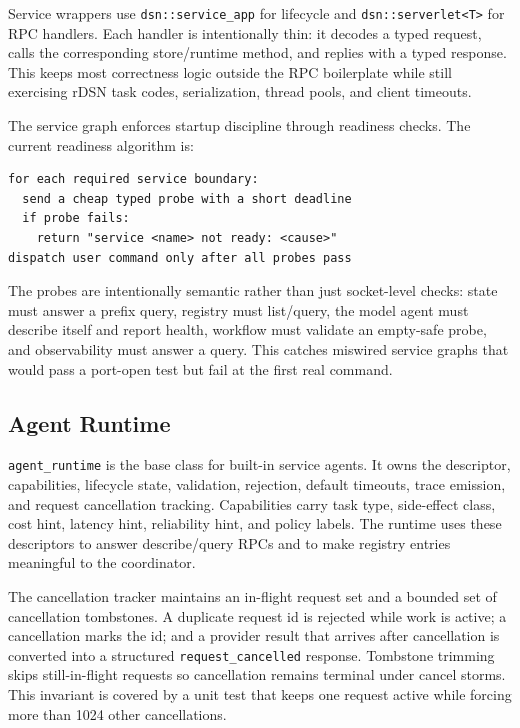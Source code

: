 \documentclass[manuscript,screen,review]{acmart}
\begin{document}
Service wrappers use \texttt{dsn::service\_app} for lifecycle and
\texttt{dsn::serverlet<T>} for RPC handlers. Each handler is intentionally thin:
it decodes a typed request, calls the corresponding store/runtime method, and
replies with a typed response. This keeps most correctness logic outside the RPC
boilerplate while still exercising rDSN task codes, serialization, thread pools,
and client timeouts.

The service graph enforces startup discipline through readiness checks. The
current readiness algorithm is:

\begin{lstlisting}
for each required service boundary:
  send a cheap typed probe with a short deadline
  if probe fails:
    return "service <name> not ready: <cause>"
dispatch user command only after all probes pass
\end{lstlisting}

The probes are intentionally semantic rather than just socket-level checks:
state must answer a prefix query, registry must list/query, the model agent must
describe itself and report health, workflow must validate an empty-safe probe,
and observability must answer a query. This catches miswired service graphs that
would pass a port-open test but fail at the first real command.

\subsection{Agent Runtime}

\texttt{agent\_runtime} is the base class for built-in service agents. It owns
the descriptor, capabilities, lifecycle state, validation, rejection, default
timeouts, trace emission, and request cancellation tracking. Capabilities carry
task type, side-effect class, cost hint, latency hint, reliability hint, and
policy labels. The runtime uses these descriptors to answer describe/query RPCs
and to make registry entries meaningful to the coordinator.

The cancellation tracker maintains an in-flight request set and a bounded set of
cancellation tombstones. A duplicate request id is rejected while work is active;
a cancellation marks the id; and a provider result that arrives after
cancellation is converted into a structured \texttt{request\_cancelled}
response. Tombstone trimming skips still-in-flight requests so cancellation
remains terminal under cancel storms. This invariant is covered by a unit test
that keeps one request active while forcing more than 1024 other cancellations.
\end{document}
